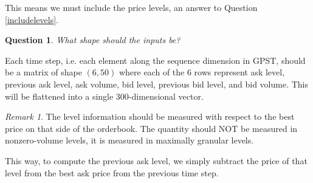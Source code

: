 \documentclass[12pt, reqno]{amsart}
\theoremstyle{definition}
\theoremstyle{definition}
\theoremstyle{plain}
\newtheorem{Ques}[theorem]{Question}
\theoremstyle{definition}
\theoremstyle{remark}
\newtheorem{rem}[theorem]{Remark}
\renewcommand{\'}{\hspace{0.5mm}'}			%
\begin{document}
This means we must include the price levels, an answer to Question \ref{includelevels}. 

\begin{Ques}
	What shape should the inputs be?
\end{Ques}

Each time step, i.e. each element along the sequence dimension in GPST, should be a matrix of shape $(6, 50)$ where each of the 6 rows represent ask level, previous ask level, ask volume, bid level, previous bid level, and bid volume. This will be flattened into a single $300$-dimensional vector. 


\begin{rem}
	The level information should be measured with respect to the best price on that side of the orderbook. The quantity should NOT be measured in nonzero-volume levels, it is measured in maximally granular levels. 
\end{rem}

This way, to compute the previous ask level, we simply subtract the price of that level from the best ask price from the previous time step. 
\end{document}
